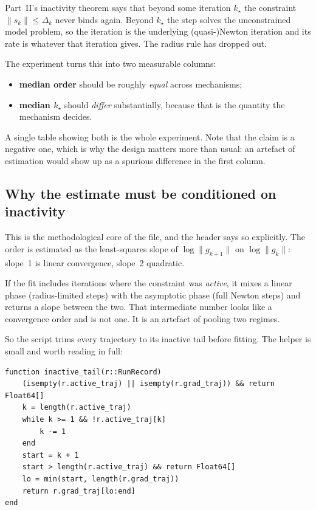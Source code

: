 \documentclass[11pt,a4paper]{article}
\newcommand{\gk}{\lVert g_k\rVert}
\begin{document}
Part~II's inactivity theorem says that beyond some iteration $k_\star$ the
constraint $\lVert s_k\rVert \le \Delta_k$ never binds again. Beyond $k_\star$ the
step solves the unconstrained model problem, so the iteration is the underlying
(quasi-)Newton iteration and its rate is whatever that iteration gives. The radius
rule has dropped out.

The experiment turns this into two measurable columns:

\begin{itemize}[leftmargin=6mm,itemsep=2pt]
  \item \textbf{median order} should be roughly \emph{equal} across mechanisms;
  \item \textbf{median $k_\star$} should \emph{differ} substantially, because that
        is the quantity the mechanism decides.
\end{itemize}

A single table showing both is the whole experiment. Note that the claim is a
negative one, which is why the design matters more than usual: an artefact of
estimation would show up as a spurious difference in the first column.

\subsection{Why the estimate must be conditioned on inactivity}

This is the methodological core of the file, and the header says so explicitly.
The order is estimated as the least-squares slope of $\log\lVert g_{k+1}\rVert$ on
$\log\gk$: slope~1 is linear convergence, slope~2 quadratic.

If the fit includes iterations where the constraint was \emph{active}, it mixes a
linear phase (radius-limited steps) with the asymptotic phase (full Newton steps)
and returns a slope between the two. That intermediate number looks like a
convergence order and is not one. It is an artefact of pooling two regimes.

So the script trims every trajectory to its inactive tail before fitting. The
helper is small and worth reading in full:

\begin{lstlisting}
function inactive_tail(r::RunRecord)
    (isempty(r.active_traj) || isempty(r.grad_traj)) && return Float64[]
    k = length(r.active_traj)
    while k >= 1 && !r.active_traj[k]
        k -= 1
    end
    start = k + 1
    start > length(r.active_traj) && return Float64[]
    lo = min(start, length(r.grad_traj))
    return r.grad_traj[lo:end]
end
\end{lstlisting}
\end{document}
